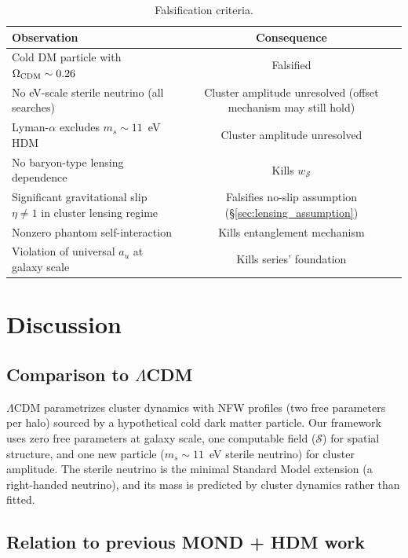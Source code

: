 \documentclass[aps,prd,twocolumn,superscriptaddress,nofootinbib]{revtex4-2}
\newcommand{\au}{a_u}
\newcommand{\wS}{w_{\mathcal{S}}}
\newcommand{\Ssrc}{\mathcal{S}}
\begin{document}
\begin{table}[h]
\caption{Falsification criteria.}
\label{tab:falsify}
\begin{ruledtabular}
\begin{tabular}{lc}
Observation & Consequence \\
\hline
Cold DM particle with $\Omega_{\rm CDM}\sim 0.26$ & Falsified \\
No eV-scale sterile neutrino (all searches) & Cluster amplitude unresolved (offset mechanism may still hold) \\
Lyman-$\alpha$ excludes $m_s\sim 11$~eV HDM & Cluster amplitude unresolved \\
No baryon-type lensing dependence & Kills $\wS$ \\
Significant gravitational slip $\eta\neq 1$ in cluster lensing regime & Falsifies no-slip assumption (\S\ref{sec:lensing_assumption}) \\
Nonzero phantom self-interaction & Kills entanglement mechanism \\
Violation of universal $\au$ at galaxy scale & Kills series' foundation \\
\end{tabular}
\end{ruledtabular}
\end{table}

\section{Discussion}
\label{sec:discussion}

\subsection{Comparison to $\Lambda$CDM}

$\Lambda$CDM parametrizes cluster dynamics with NFW profiles (two free parameters per halo) sourced by a hypothetical cold dark matter particle. Our framework uses zero free parameters at galaxy scale, one computable field ($\Ssrc$) for spatial structure, and one new particle ($m_s\sim 11$~eV sterile neutrino) for cluster amplitude. The sterile neutrino is the minimal Standard Model extension (a right-handed neutrino), and its mass is predicted by cluster dynamics rather than fitted.

\subsection{Relation to previous MOND + HDM work}
\end{document}

